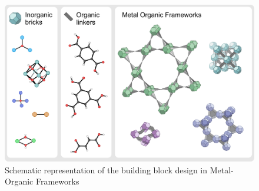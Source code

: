 \begin{figure}[!htbp]
	\centering
 	\includegraphics[width=1.0\textwidth]{MOFs}
	\caption{Schematic representation of the building block design in Metal-Organic Frameworks}
	\label{fig:MOFs}
\end{figure}

